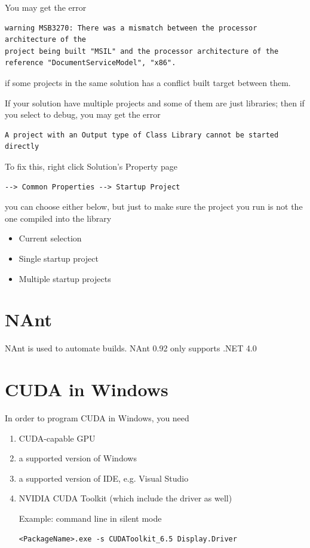 You may get the error
\begin{verbatim}
warning MSB3270: There was a mismatch between the processor architecture of the
project being built "MSIL" and the processor architecture of the reference "DocumentServiceModel", "x86".
\end{verbatim}
if some projects in the same solution has a conflict built target between them.

If your solution have multiple projects and some of them are just libraries;
then if you select to debug, you may get the error
\begin{verbatim}
A project with an Output type of Class Library cannot be started directly
\end{verbatim}
To fix this, right click Solution's Property page
\begin{verbatim}
--> Common Properties --> Startup Project
\end{verbatim}
you can choose either below, but just to make sure the project you run is not
the one compiled into the library
\begin{itemize}
  \item Current selection
  \item Single startup project
  \item Multiple startup projects
\end{itemize}

\section{NAnt}
\label{sec:NAnt}

NAnt is used to automate builds.
NAnt 0.92 only supports .NET 4.0

\section{CUDA in Windows}

In order to program CUDA in Windows, you need
\begin{enumerate}
  \item CUDA-capable GPU
  \item a supported version of Windows
  \item a supported version of IDE, e.g. Visual Studio
  \item NVIDIA CUDA Toolkit (which include the driver as well)
  
Example: command line in silent mode  
\begin{verbatim}
<PackageName>.exe -s CUDAToolkit_6.5 Display.Driver
\end{verbatim}  
\end{enumerate}


